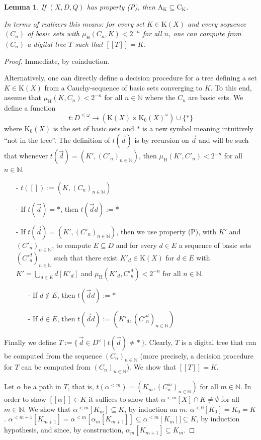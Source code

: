 \documentclass[microtype]{jloganal}
\theoremstyle{plain}
\newtheorem{lemma}[theorem]{Lemma}
\theoremstyle{definition}
\newcommand{\NN}{\mathbb{N}}
\newcommand{\coco}{\mathrm{C}}
\newcommand{\compact}{\mathrm{K}}
\newcommand{\hdm}{\mu_{\mathrm H}}
\newcommand{\val}[1]{[\![#1]\!]}
\newcommand{\cauchy}{\mathrm{A}}
\newcommand{\basic}{\mathrm{K}_0}
\begin{document}
\begin{lemma}
\label{lem-p}
If $(X,D,Q)$ has property (P), then 
$\cauchy_\compact \subseteq\coco_\compact$.

In terms of realizers this means: for every set $K \in \compact(X)$ 
and every sequence $(C_n)$ of basic sets with $\hdm(C_n,K) < 2^{-n}$ for all 
$n$, one can compute from $(C_n)$ a digital tree $T$ such that $\val{T} = K$.
\end{lemma}
\begin{proof}
Immediate, by coinduction.

Alternatively, one can directly define a decision procedure for a tree defining
a set $K\in\compact(X)$ from a Cauchy-sequence of basic sets converging to $K$.
To this end, assume that $\hdm(K,C_n)<2^{-n}$ for all $n\in\NN$ where the 
$C_n$ are basic sets. We define a function 
\[t : D^{\le\omega} \to (\compact(X)\times\basic(X)^\omega)\cup\{\ast\}\]
where $\basic(X)$ is the set of basic sets and $\ast$ is a new symbol
meaning intuitively ``not in the tree''. The definition of $t(\vec d)$ is
by recursion on $\vec d$ and will be such that whenever 
$t(\vec d) = (K',(C'_n)_{n\in\NN})$, then $\hdm(K',C'_n)<2^{-n}$ for all 
$n\in\NN$.
\begin{itemize}
\item[-] $t([]) := (K,(C_n)_{n\in\NN})$
\item[-] If $t(\vec d) =\ast$, then $t(\vec dd) := \ast$
\item[-] If $t(\vec d) = (K',(C'_n)_{n\in\NN})$, then we use 
property (P), with $K'$ and $(C'_n)_{n\in\NN}$, to compute $E\subseteq D$
and for every $d\in E$ a sequence of basic sets $(C'^d_n)_{n\in\NN}$ such that 
there exist $K'_d\in\compact(X)$ for $d\in E$ with 
$K'=\bigcup_{d\in E}d[K'_d]$ and $\hdm(K'_d,C'^d_n)<2^{-n}$ for all $n\in\NN$.
\begin{itemize}
\item[-] If $d\not\in E$, then $t(\vec dd) := \ast$
\item[-] If $d\in E$, then $t(\vec dd) := (K'_d,(C'^d_n)_{n\in\NN})$
\end{itemize}
\end{itemize}
Finally we define $T := \{\,\vec d \in D^\omega \mid t(\vec d) \neq \ast\,\}$.
Clearly, $T$ is a digital tree that can be computed from the sequence
$(C_n)_{n\in\NN}$ (more precisely, a decision procedure for $T$ can be
computed from $(C_n)_{n\in\NN}$). We show that $\val{T} = K$.

Let $\alpha$ be a path in $T$, that is, 
$t(\alpha^{< m})=(K_m,(C^m_n)_{n\in\NN})$ for all $m\in\NN$.
In order to show $\val{\alpha}\in K$ it suffices to show
that $\alpha^{< m}[X]\cap K\neq\emptyset$ for all $m\in\NN$.
We show that $\alpha^{< m}[K_m]\subseteq K$, by induction on $m$. 
$\alpha^{< 0}[K_0] = K_0 = K$.
$\alpha^{< m+1}[K_{m+1}] = \alpha^{< m}[\alpha_m[K_{m+1}]] \subseteq
\alpha^{< m}[K_{m}]] \subseteq K$, by induction hypothesis, and since,
by construction, $\alpha_m[K_{m+1}] \subseteq K_m$.


\end{proof}
\end{document}
